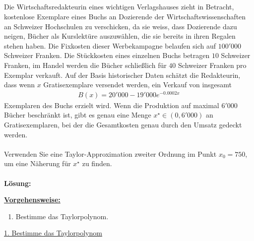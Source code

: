  
\newpage

\subsection*{}
Die Wirtschaftsredakteurin eines wichtigen Verlagshauses zieht in Betracht,
kostenlose Exemplare eines Buchs an Dozierende der Wirtschaftswissenschaften an Schweizer Hochschulen zu verschicken, da sie weiss, dass Dozierende dazu neigen, Bücher als Kurslektüre auszuwählen, die sie bereits in ihren Regalen stehen haben. Die Fixkosten dieser Werbekampagne belaufen sich auf $100'000$ Schweizer Franken.
Die Stückkosten eines einzelnen Buchs betragen $10$ Schweizer Franken, im Handel werden die Bücher schließlich für $40$ Schweizer Franken pro Exemplar verkauft.
Auf der Basis historischer Daten schätzt die Redakteurin, dass wenn $x$ Gratisexemplare versendet werden, ein Verkauf von insgesamt
\begin{align*}
	B(x) = 20'000 - 19'000 e^{-0.0002 x }
\end{align*}
Exemplaren des Buchs erzielt wird. Wenn die Produktion auf maximal $6'000$ Bücher beschränkt ist, gibt es genau eine Menge $ x^\star \in (0, 6'000)$ an Gratisexemplaren, bei der die Gesamtkosten genau durch den Umsatz gedeckt werden.\\
\\
Verwenden Sie eine Taylor-Approximation zweiter Ordnung im Punkt $x_0 = 750$, um eine Näherung für $x^\star$ zu finden.
\\
 \\
\textbf{Lösung:}
\begin{mdframed}
\underline{\textbf{Vorgehensweise:}}
\renewcommand{\labelenumi}{\theenumi.}
\begin{enumerate}
\item Bestimme das Taylorpolynom. 
\end{enumerate}
\end{mdframed}

\underline{1. Bestimme das Taylorpolynom}\\

\newpage
